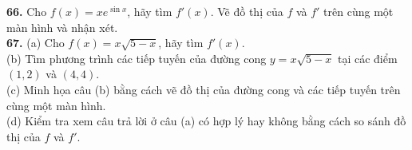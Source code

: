 \begin{minipage}[t]{0.485\textwidth}
  \noindent\llap{\casicon\hspace{4pt}}\textbf{66.} Cho $f(x) = x e^{\sin x}$, hãy tìm $f'(x)$. Vẽ đồ thị của $f$ và $f'$ trên cùng một màn hình và nhận xét.\\[7pt]

  \textbf{67.} (a) Cho $f(x) = x\sqrt{5 - x}$, hãy tìm $f'(x)$.\\[3pt]
  \hspace*{1.4em}(b) Tìm phương trình các tiếp tuyến của đường cong $y = x\sqrt{5 - x}$ tại các điểm $(1, 2)$ và $(4, 4)$.\\[3pt]
  \noindent\llap{\casicon\hspace{4pt}}\hspace*{1.4em}(c) Minh họa câu (b) bằng cách vẽ đồ thị của đường cong và các tiếp tuyến trên cùng một màn hình.\\[3pt]
  \noindent\llap{\casicon\hspace{4pt}}\hspace*{1.4em}(d) Kiểm tra xem câu trả lời ở câu (a) có hợp lý hay không bằng cách so sánh đồ thị của $f$ và $f'$.
\end{minipage}
